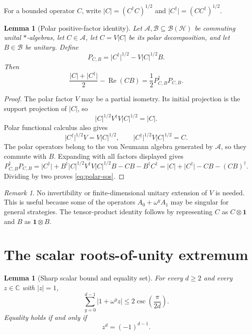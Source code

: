\documentclass[11pt]{article}
\newtheorem{lemma}[theorem]{Lemma}
\theoremstyle{remark}
\newtheorem{remark}[theorem]{Remark}
\newcommand{\Id}{\mathbf 1}
\newcommand{\cH}{\mathcal H}
\newcommand{\Reop}{\operatorname{Re}}
\newcommand{\bbC}{\mathbb C}
\newcommand{\absop}[1]{\lvert #1\rvert}
\begin{document}
For a bounded operator \(C\), write
\(
\absop{C}=(C^\dagger C)^{1/2}
\)
and
\(
\absop{C^\dagger}=(CC^\dagger)^{1/2}
\).

\begin{lemma}[Polar positive-factor identity]
\label{lem:polar}
Let \(\mathcal A,\mathcal B\subseteq\mathcal B(\cH)\) be commuting
unital \(*\)-algebras, let \(C\in\mathcal A\), let
\(C=V\absop C\) be its polar decomposition, and let \(B\in\mathcal B\)
be unitary.  Define
\[
  P_{C,B}
  =
  \absop{C^\dagger}^{1/2}
  -
  V\absop C^{1/2}B .
\]
Then
\begin{equation}
  \frac{\absop C+\absop{C^\dagger}}2
  -
  \Reop(CB)
  =
  \frac12 P_{C,B}^\dagger P_{C,B}.
  \label{eq:polar-sos}
\end{equation}
\end{lemma}

\begin{proof}
The polar factor \(V\) may be a partial isometry.  Its initial projection is
the support projection of \(\absop C\), so
\[
  \absop C^{1/2}V^\dagger V\absop C^{1/2}=\absop C.
\]
Polar functional calculus also gives
\[
  \absop{C^\dagger}^{1/2}V
  =
  V\absop C^{1/2},
  \qquad
  \absop{C^\dagger}^{1/2}V\absop C^{1/2}=C.
\]
The polar operators belong to the von Neumann algebra generated by
\(\mathcal A\), so they commute with \(B\).  Expanding with all factors
displayed gives
\[
  P_{C,B}^\dagger P_{C,B}
  =
  \absop{C^\dagger}
  +B^\dagger\absop C^{1/2}V^\dagger V\absop C^{1/2}B
  -CB-B^\dagger C^\dagger
  =
  \absop C+\absop{C^\dagger}-CB-(CB)^\dagger .
\]
Dividing by two proves \eqref{eq:polar-sos}.
\end{proof}

\begin{remark}
No invertibility or finite-dimensional unitary extension of \(V\) is needed.
This is useful because some of the operators \(A_0+\omega^yA_1\) may be
singular for general strategies.  The tensor-product identity follows by
representing \(C\) as \(C\otimes\Id\) and \(B\) as \(\Id\otimes B\).
\end{remark}

\section{The scalar roots-of-unity extremum}

\begin{lemma}[Sharp scalar bound and equality set]
\label{lem:scalar}
For every \(d\geq2\) and every \(z\in\bbC\) with \(\lvert z\rvert=1\),
\begin{equation}
  \sum_{y=0}^{d-1}\lvert1+\omega^y z\rvert
  \leq
  2\csc\!\left(\frac{\pi}{2d}\right).
  \label{eq:scalar}
\end{equation}
Equality holds if and only if
\begin{equation}
  z^d=(-1)^{d-1}.
  \label{eq:equality-set}
\end{equation}
\end{lemma}
\end{document}
